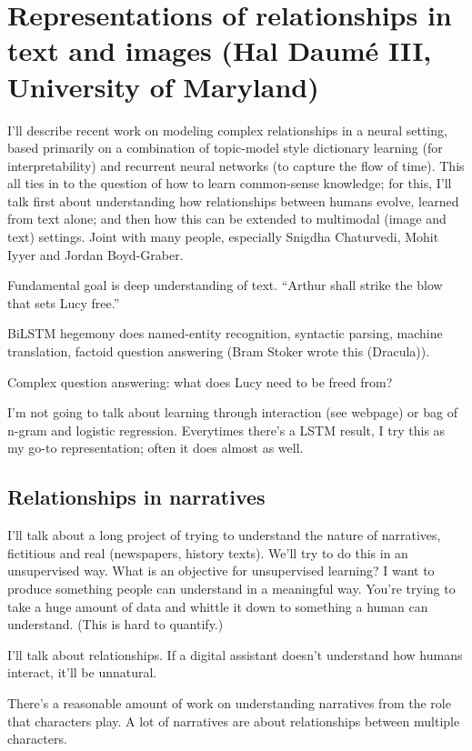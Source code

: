 \section{Representations of relationships in text and images (Hal Daum\'e III, University of Maryland)}

I'll describe recent work on modeling complex relationships in a neural setting, based primarily on a combination of topic-model style dictionary learning (for interpretability) and recurrent neural networks (to capture the flow of time). This all ties in to the question of how to learn common-sense knowledge; for this, I'll talk first about understanding how relationships between humans evolve, learned from text alone; and then how this can be extended to multimodal (image and text) settings. Joint with many people, especially Snigdha Chaturvedi, Mohit Iyyer and Jordan Boyd-Graber.

Fundamental goal is deep understanding of text.
``Arthur shall strike the blow that sets Lucy free.''

BiLSTM hegemony does named-entity recognition, syntactic parsing, machine translation, factoid question answering (Bram Stoker wrote this (Dracula)). 

Complex question answering: what does Lucy need to be freed from?

I'm not going to talk about learning through interaction (see webpage) or bag of n-gram and logistic regression. Everytimes there's a LSTM result, I try this as my go-to representation; often it does almost as well.

\subsection{Relationships in narratives}

I'll talk about a long project of trying to understand the nature of narratives, fictitious and real (newspapers, history texts). We'll try to do this in an unsupervised way. What is an objective for unsupervised learning? I want to produce something people can understand in a meaningful way. You're trying to take a huge amount of data and whittle it down to something a human can understand. (This is hard to quantify.)

I'll talk about relationships. If a digital assistant doesn't understand how humans interact, it'll be unnatural.

There's a reasonable amount of work on understanding narratives from the role that characters play. A lot of narratives are about relationships between multiple characters.

